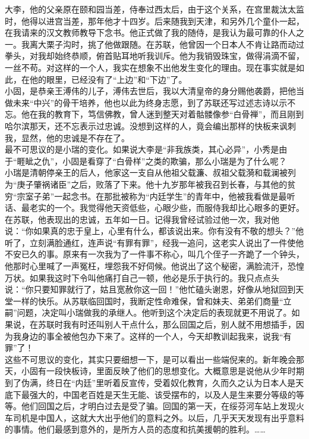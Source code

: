 大李，他的父亲原在颐和园当差，侍奉过西太后，由于这个关系，在宫里裁汰太监时，他得以进宫当差，那年他才十四岁。后来随我到天津，和另外几个童仆一起，在我请来的汉文教师教导下念书。他正式做了我的随侍，是我认为最可靠的仆人之一。我离大栗子沟时，挑了他做跟随。在苏联，他曾因一个日本人不肯让路而动过拳头，对我却始终恭顺，俯首贴耳地听我训斥。他为我销毁珠宝，做得涓滴不留，一丝不苟。对这样的一个人，我实在想象不出他发生变化的理由。现在事实就是如此，在他的眼里，已经没有了“上边”和“下边”了。\\

小固，是恭亲王溥伟的儿子，溥伟去世后，我以大清皇帝的身分赐他袭爵，把他当做未来“中兴”的骨干培养，他也以此为终身志愿，到了苏联还写过述志诗以示不忘。他在我的教育下，笃信佛教，曾人迷到整天对着骷髅像参“白骨禅”，而且刚到哈尔滨那天，还不忘表示过忠诚。没想到这样的人，竟会编出那样的快板来讽刺我，显然，他的忠诚是不存在了。\\

最不可思议的是小瑞的变化。如果说大李是“非我族类，其心必异”，小秀是由于“睚眦之仇”，小固是看穿了“白骨样”之类的欺骗，那么小瑞是为了什么呢？\\

小瑞是清朝停亲王的后人，他家这一支自从他祖父载濂、叔祖父载漪和载澜被列为“庚子肇祸诸臣”之后，败落了下来。他十九岁那年被我召到长春，与其他的贫穷“宗室子弟”一起念书。在那批被称为“内廷学生”的青年中，他被我看做是最听话、最老实的一个。我觉得他天资低些，心眼少些，而服侍我却比心眼多的更好。在苏联，他表现出的忠诚，五年如一日。记得我曾经试验过他一次，我对他说：“你如果真的忠于皇上，心里有什么，都该说出来。你有没有不敬的想头？”他听了，立刻满脸通红，连声说“有罪有罪”，经我一追问，这老实人说出了一件使他不安已久的事。原来有一次我为了一件事不称心，叫几个侄子一齐跪了一个钟头，他那时心里喊了一声冤枉，埋怨我不好伺候。他说出了这个秘密，满脸流汗，恐惶万状。如果我这时下令叫他痛打自己一顿，他必是乐于执行的。我只点点头说：“你只要知罪就行了，姑且宽赦你这一回！”他忙磕头谢恩，好像从地狱回到天堂一样的快乐。从苏联临回国时，我断定性命难保，曾和妹夫、弟弟们商量“立嗣”问题，决定叫小瑞做我的承继人。他听到这个决定后的表现就更不用说了。如果说，在苏联时我有时还叫别人干点什么，那么回国之后，别人就不用想插手，因为我身边的事全被他包办下来了。这样的一个人，今天却教训起我来，说我“有罪”了！\\

这些不可思议的变化，其实只要细想一下，是可以看出一些端倪来的。新年晚会那天，小固有一段快板诗，里面反映了他们的思想变化。大概意思是说他从少年时期到了伪满，终日在“内廷”里听着反宣传，受着奴化教育，久而久之认为日本人是天底下最强大的，中国老百姓是天生无能、该受摆布的，以及人是生来要分等级的等等。他们回国之后，才明白过去是受了骗。回国的第一天，在绥芬河车站上发现火车司机是中国人，这就大大出乎他们的意料之外。以后，几乎天天发现有出乎意料的事情。他们最感到意外的，是所方人员的态度和抗美援朝的胜利。……\\

